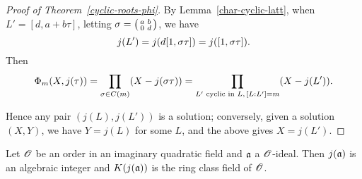 \begin{proof}[Proof of Theorem~\ref{cyclic-roots-phi}]
By Lemma~\ref{char-cyclic-latt}, when $L'=[d, a+b\tau]$, letting $\sigma=\left(\begin{smallmatrix} {a}&{b}\\ {0}&{d} \end{smallmatrix}\right)$, we have
\[
j(L')=j(d[1,\sigma \tau])=j([1,\sigma\tau]).
\]
Then
\[
\Phi_m(X,j(\tau))=\prod_{\sigma\in C(m)} (X-j(\sigma\tau))=\prod_{L'\text{ cyclic in }L, \,[L:L']=m} (X-j(L')).
\]

Hence any pair $(j(L),j(L'))$ is a solution; conversely, given a solution $(X,Y)$, we have $Y=j(L)$ for some $L$, and the above gives $X=j(L')$.
\end{proof}

\begin{thm}
Let $\mathscr{O}$ be an order in an imaginary quadratic field and $\mathfrak{a}$ a $\mathscr{O}$-ideal. Then $j(\mathfrak{a})$ is an algebraic integer and
$K(j(\mathfrak{a}))$ is the ring class field of $\mathscr{O}$.
\end{thm}
